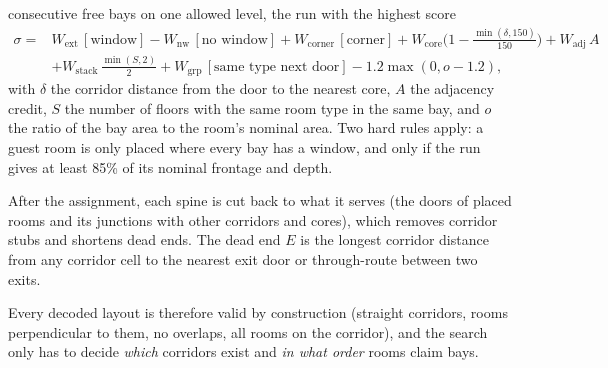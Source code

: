 \begin{enumerate}
consecutive free bays on one allowed level, the run with the highest score
\begin{align*} \sigma ={}& W_{\text{ext}}\,[\text{window}] - W_{\text{nw}}\,[\text{no window}] + W_{\text{corner}}\,[\text{corner}]
+ W_{\text{core}}\Big(1 - \tfrac{\min(\delta,150)}{150}\Big) + W_{\text{adj}}\,A \\
&+ W_{\text{stack}}\,\tfrac{\min(S,2)}{2} + W_{\text{grp}}\,[\text{same type next door}] - 1.2\max(0, o - 1.2),
\end{align*}
with $\delta$ the corridor distance from the door to the nearest core, $A$ the adjacency credit, $S$ the number of floors
with the same room type in the same bay, and $o$ the ratio of the bay area to the room's nominal area. Two hard rules apply:
a guest room is only placed where every bay has a window, and only if the run gives at least 85\% of its nominal frontage
and depth.
\end{enumerate}
After the assignment, each spine is cut back to what it serves (the doors of placed rooms and its junctions with
other corridors and cores), which removes corridor stubs and shortens dead ends. The dead end $E$ is the longest
corridor distance from any corridor cell to the nearest exit door or through-route between two exits.

Every decoded layout is therefore valid by construction (straight corridors, rooms perpendicular to them, no overlaps, all
rooms on the corridor), and the search only has to decide \emph{which} corridors exist and \emph{in what order} rooms claim
bays.

